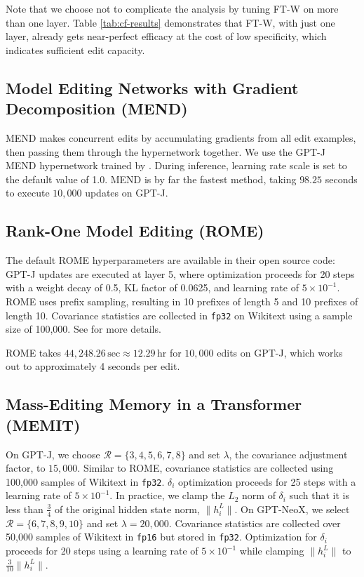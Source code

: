 \documentclass{article} %
\newcommand{\method}{MEMIT\xspace}
\newcommand{\atl}[2]{#1^{#2}}
\newcommand{\iclrnew}[1]{#1}
\begin{document}
Note that we choose not to complicate the analysis by tuning FT-W on more than one layer. Table \ref{tab:cf-results} demonstrates that FT-W, with just one layer, already gets near-perfect efficacy at the cost of low specificity, which indicates sufficient edit capacity.


\subsection{Model Editing Networks with Gradient Decomposition (MEND)}

\iclrnew{MEND makes concurrent edits by accumulating gradients from all edit examples, then passing them through the hypernetwork together.} We use the GPT-J MEND hypernetwork trained by \citet{meng2022locating}. During inference, learning rate scale is set to the default value of 1.0. MEND is by far the fastest method, taking $98.25$ seconds to execute $10{,}000$ updates on GPT-J.

\subsection{Rank-One Model Editing (ROME)}

The default ROME hyperparameters are available in their open source code: GPT-J updates are executed at layer 5, where optimization proceeds for 20 steps with a weight decay of 0.5, KL factor of 0.0625, and learning rate of $5\times 10^{-1}$. ROME uses prefix sampling, resulting in 10 prefixes of length 5 and 10 prefixes of length 10. Covariance statistics are collected in \texttt{fp32} on Wikitext using a sample size of 100{,}000. See \citet{meng2022locating} for more details.

ROME takes $44{,}248.26\,\mathrm{sec} \approx 12.29\,\mathrm{hr}$ for $10{,}000$ edits on GPT-J, which works out to approximately 4 seconds per edit.

\subsection{Mass-Editing Memory in a Transformer (\method)}

On GPT-J, we choose $\mathcal{R} = \{ 3,4,5,6,7,8 \}$ and set $\lambda$, the covariance adjustment factor, to $15{,}000$. Similar to ROME, covariance statistics are collected using 100{,}000 samples of Wikitext in \texttt{fp32}. $\delta_i$ optimization proceeds for 25 steps with a learning rate of $5\times 10^{-1}$. In practice, we clamp the $L_2$ norm of $\delta_i$ such that it is less than $\frac{3}{4}$ of the original hidden state norm, $\lVert \atl{h}{L}_i \rVert$.
On GPT-NeoX, we select $\mathcal{R} = \{ 6,7,8,9,10 \}$ and set $\lambda = 20{,}000$. Covariance statistics are collected over 50{,}000 samples of Wikitext in \texttt{fp16} but stored in \texttt{fp32}. Optimization for $\delta_i$ proceeds for 20 steps using a learning rate of $5 \times 10^{-1}$ while clamping $\lVert \atl{h}{L}_i \rVert$ to $\frac{3}{10} \lVert \atl{h}{L}_i \rVert$.
\end{document}
